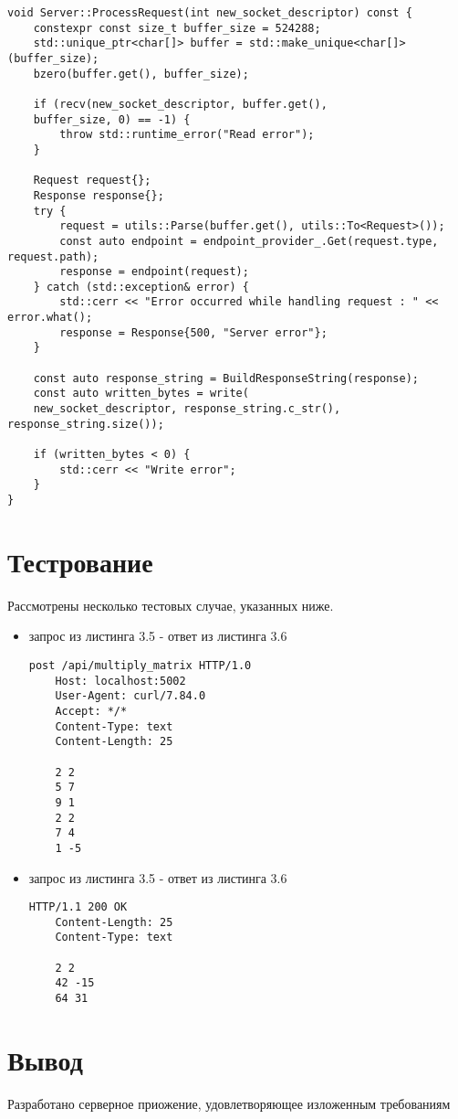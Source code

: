 \begin{lstlisting}[caption=Реализация сервара из файла server/server.cpp]
void Server::ProcessRequest(int new_socket_descriptor) const {
	constexpr const size_t buffer_size = 524288;
	std::unique_ptr<char[]> buffer = std::make_unique<char[]>(buffer_size);
	bzero(buffer.get(), buffer_size);
	
	if (recv(new_socket_descriptor, buffer.get(),
	buffer_size, 0) == -1) {
		throw std::runtime_error("Read error");
	}
	
	Request request{};
	Response response{};
	try {
		request = utils::Parse(buffer.get(), utils::To<Request>());
		const auto endpoint = endpoint_provider_.Get(request.type, request.path);
		response = endpoint(request);
	} catch (std::exception& error) {
		std::cerr << "Error occurred while handling request : " << error.what();
		response = Response{500, "Server error"};
	}
	
	const auto response_string = BuildResponseString(response);
	const auto written_bytes = write(
	new_socket_descriptor, response_string.c_str(), response_string.size());
	
	if (written_bytes < 0) {
		std::cerr << "Write error";
	}
}	
\end{lstlisting}


\section{Тестрование}

Рассмотрены несколько тестовых случае, указанных ниже.

\begin{itemize}
	\item запрос из листинга 3.5 - ответ из листинга 3.6
	\begin{lstlisting}[caption={Запрос, проверяющий правильность ответа на корректных данных}]
	post /api/multiply_matrix HTTP/1.0
	Host: localhost:5002
	User-Agent: curl/7.84.0
	Accept: */*
	Content-Type: text
	Content-Length: 25
	
	2 2
	5 7
	9 1
	2 2
	7 4
	1 -5
	\end{lstlisting}
\end{itemize}

\begin{itemize}
	\item запрос из листинга 3.5 - ответ из листинга 3.6
	\begin{lstlisting}[caption={Ожидаемый ответ на запрос из листинга 3.5}]
	HTTP/1.1 200 OK
	Content-Length: 25
	Content-Type: text
	
	2 2
	42 -15
	64 31
	\end{lstlisting}
\end{itemize}

\newpage
\section*{Вывод}

Разработано серверное приожение, удовлетворяющее изложенным требованиям
